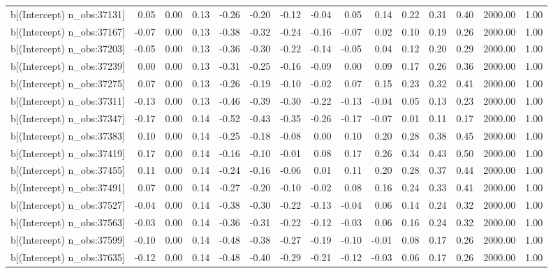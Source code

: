 \begin{table}[ht]
\begin{tabular}{rrrrrrrrrrrrrrr}
  b[(Intercept) n\_obs:37131] & 0.05 & 0.00 & 0.13 & -0.26 & -0.20 & -0.12 & -0.04 & 0.05 & 0.14 & 0.22 & 0.31 & 0.40 & 2000.00 & 1.00 \\ 
  b[(Intercept) n\_obs:37167] & -0.07 & 0.00 & 0.13 & -0.38 & -0.32 & -0.24 & -0.16 & -0.07 & 0.02 & 0.10 & 0.19 & 0.26 & 2000.00 & 1.00 \\ 
  b[(Intercept) n\_obs:37203] & -0.05 & 0.00 & 0.13 & -0.36 & -0.30 & -0.22 & -0.14 & -0.05 & 0.04 & 0.12 & 0.20 & 0.29 & 2000.00 & 1.00 \\ 
  b[(Intercept) n\_obs:37239] & 0.00 & 0.00 & 0.13 & -0.31 & -0.25 & -0.16 & -0.09 & 0.00 & 0.09 & 0.17 & 0.26 & 0.36 & 2000.00 & 1.00 \\ 
  b[(Intercept) n\_obs:37275] & 0.07 & 0.00 & 0.13 & -0.26 & -0.19 & -0.10 & -0.02 & 0.07 & 0.15 & 0.23 & 0.32 & 0.41 & 2000.00 & 1.00 \\ 
  b[(Intercept) n\_obs:37311] & -0.13 & 0.00 & 0.13 & -0.46 & -0.39 & -0.30 & -0.22 & -0.13 & -0.04 & 0.05 & 0.13 & 0.23 & 2000.00 & 1.00 \\ 
  b[(Intercept) n\_obs:37347] & -0.17 & 0.00 & 0.14 & -0.52 & -0.43 & -0.35 & -0.26 & -0.17 & -0.07 & 0.01 & 0.11 & 0.17 & 2000.00 & 1.00 \\ 
  b[(Intercept) n\_obs:37383] & 0.10 & 0.00 & 0.14 & -0.25 & -0.18 & -0.08 & 0.00 & 0.10 & 0.20 & 0.28 & 0.38 & 0.45 & 2000.00 & 1.00 \\ 
  b[(Intercept) n\_obs:37419] & 0.17 & 0.00 & 0.14 & -0.16 & -0.10 & -0.01 & 0.08 & 0.17 & 0.26 & 0.34 & 0.43 & 0.50 & 2000.00 & 1.00 \\ 
  b[(Intercept) n\_obs:37455] & 0.11 & 0.00 & 0.14 & -0.24 & -0.16 & -0.06 & 0.01 & 0.11 & 0.20 & 0.28 & 0.37 & 0.44 & 2000.00 & 1.00 \\ 
  b[(Intercept) n\_obs:37491] & 0.07 & 0.00 & 0.14 & -0.27 & -0.20 & -0.10 & -0.02 & 0.08 & 0.16 & 0.24 & 0.33 & 0.41 & 2000.00 & 1.00 \\ 
  b[(Intercept) n\_obs:37527] & -0.04 & 0.00 & 0.14 & -0.38 & -0.30 & -0.22 & -0.13 & -0.04 & 0.06 & 0.14 & 0.24 & 0.32 & 2000.00 & 1.00 \\ 
  b[(Intercept) n\_obs:37563] & -0.03 & 0.00 & 0.14 & -0.36 & -0.31 & -0.22 & -0.12 & -0.03 & 0.06 & 0.16 & 0.24 & 0.32 & 2000.00 & 1.00 \\ 
  b[(Intercept) n\_obs:37599] & -0.10 & 0.00 & 0.14 & -0.48 & -0.38 & -0.27 & -0.19 & -0.10 & -0.01 & 0.08 & 0.17 & 0.26 & 2000.00 & 1.00 \\ 
  b[(Intercept) n\_obs:37635] & -0.12 & 0.00 & 0.14 & -0.48 & -0.40 & -0.29 & -0.21 & -0.12 & -0.03 & 0.06 & 0.17 & 0.26 & 2000.00 & 1.00 \\ 

\end{tabular}
\end{table}
